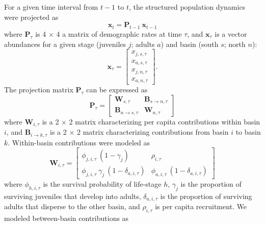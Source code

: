 For a given time interval from $t-1$ to $t$, 
the structured population dynamics were projected as
%
\begin{equation} \label{eq:XPX}
    \mathbf{x}_t = \mathbf{P}_{t-1}~\mathbf{x}_{t-1}
\end{equation}
%
where $\mathbf{P}_{\tau}$ is 4 $\times$ 4 a matrix of demographic rates at time $\tau$, 
and $\mathbf{x}_{\tau}$ is a vector abundances 
for a given stage (juveniles $j$; adults $a$) 
and basin (south $s$; north $n$):
%
\begin{equation} \label{eq:X}
\mathbf{x}_{\tau} = 
\left[
\begin{array}{cccc}
    {x_{j,s,\tau}} \\
    {x_{a,s,\tau}} \\
    {x_{j,n,\tau}} \\
    {x_{a,n,\tau}}
    \end{array}
\right]
\text{.}
\end{equation}
%
The projection matrix $\mathbf{P}_{\tau}$ can be expressed as
%
\begin{equation} \label{eq:P}
\mathbf{P}_{\tau} = 
\left[
\begin{array}{c|ccc}
    \mathbf{W}_{s,\tau}  & \mathbf{B}_{s\rightarrow n,\tau} \\
    \hline
    \mathbf{B}_{n\rightarrow s,\tau} & \mathbf{W}_{n,\tau}
    \end{array}
\right]
\end{equation}
%
where $\mathbf{W}_{i,\tau}$ is a 2 $\times$ 2 matrix characterizing 
per capita contributions within basin $i$,
and $\mathbf{B}_{i\rightarrow k,\tau}$ is a 2 $\times$ 2 matrix characterizing 
contributions from basin $i$ to basin $k$.
Within-basin contributions were modeled as 
\begin{equation} \label{eq:W}
\mathbf{W}_{i,\tau} = 
\left[
\begin{array}{cccc}
    \phi_{j,i,\tau}~(1-\gamma_{j}) & 
    \rho_{i,\tau} \\
    \phi_{j,i,\tau}~\gamma_{j}~(1-\delta_{a,i,\tau}) & 
    \phi_{a,i,\tau}~(1-\delta_{a,i,\tau})
    \end{array}
\right]
\end{equation}
%
where $\phi_{h,i,\tau}$ is the survival probability of life-stage $h$, 
$\gamma_{j}$ is the proportion of surviving juveniles that develop into adults,
$\delta_{a,i,\tau}$ is the proportion of surviving adults that disperse to the other basin,
and $\rho_{i,\tau}$ is per capita recruitment.
We modeled between-basin contributions as

